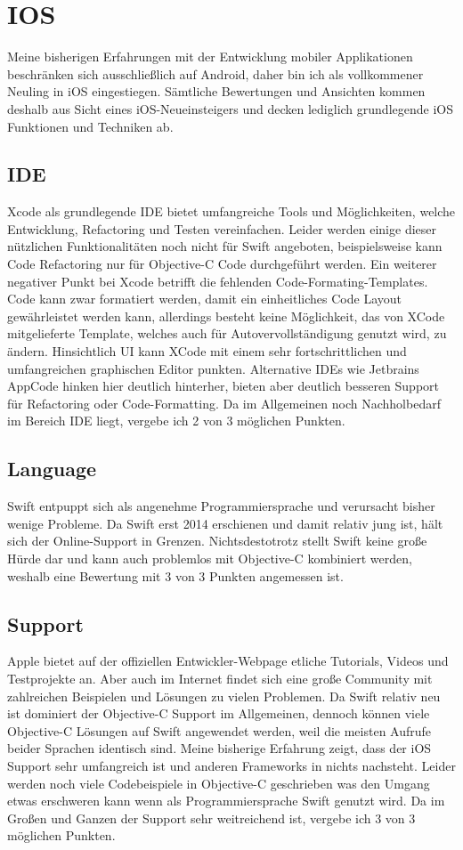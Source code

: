 \section{IOS}
Meine bisherigen Erfahrungen mit der Entwicklung mobiler Applikationen beschränken sich ausschließlich auf Android, daher bin ich als vollkommener Neuling in iOS eingestiegen. Sämtliche Bewertungen und Ansichten kommen deshalb aus Sicht eines iOS-Neueinsteigers und decken lediglich grundlegende iOS Funktionen und Techniken ab.
\subsection{IDE}
Xcode als grundlegende IDE bietet umfangreiche Tools und Möglichkeiten, welche Entwicklung, Refactoring und Testen vereinfachen. Leider werden einige dieser nützlichen Funktionalitäten noch nicht für Swift angeboten, beispielsweise kann Code Refactoring nur für Objective-C Code durchgeführt werden. Ein weiterer negativer Punkt bei Xcode betrifft die fehlenden Code-Formating-Templates. Code kann zwar formatiert werden, damit ein einheitliches Code Layout gewährleistet werden kann, allerdings besteht keine Möglich\-keit, das von XCode mitgelieferte Template, welches auch für Autovervollständigung genutzt wird, zu ändern. Hinsichtlich UI kann XCode mit einem sehr fortschrittlichen und umfangreichen graphischen Editor punkten. Alternative IDEs wie Jetbrains AppCode hinken hier deutlich hinterher, bieten aber deutlich besseren Support für Refactoring oder Code-Formatting. Da im Allgemeinen noch Nachholbedarf im Bereich IDE liegt, vergebe ich 2 von 3 möglichen Punkten.
\subsection{Language}
Swift entpuppt sich als angenehme Programmiersprache und verursacht bisher wenige Probleme. Da Swift erst 2014 erschienen und damit relativ jung ist, hält sich der Online-Support in Grenzen. Nichtsdestotrotz stellt Swift keine große Hürde dar und kann auch problemlos mit Objective-C kombiniert werden, weshalb eine Bewertung mit 3 von 3 Punkten angemessen ist.
\vfill
\subsection{Support}
Apple bietet auf der offiziellen Entwickler-Webpage etliche Tutorials, Videos und Testprojekte an. Aber auch im Internet findet sich eine große Community mit zahlreichen Beispielen und Lösungen zu vielen Problemen. Da Swift relativ neu ist dominiert der Objective-C Support im Allgemeinen, dennoch können viele Objective-C Lösungen auf Swift angewendet werden, weil die meisten Aufrufe beider Sprachen identisch sind. Meine bisherige Erfahrung zeigt, dass der iOS Support sehr umfangreich ist und anderen Frameworks in nichts nachsteht. Leider werden noch viele Codebeispiele in Objective-C geschrieben was den Umgang etwas erschweren kann wenn als Programmiersprache Swift genutzt wird. Da im Großen und Ganzen der Support sehr weitreichend ist, vergebe ich 3 von 3 möglichen Punkten.
